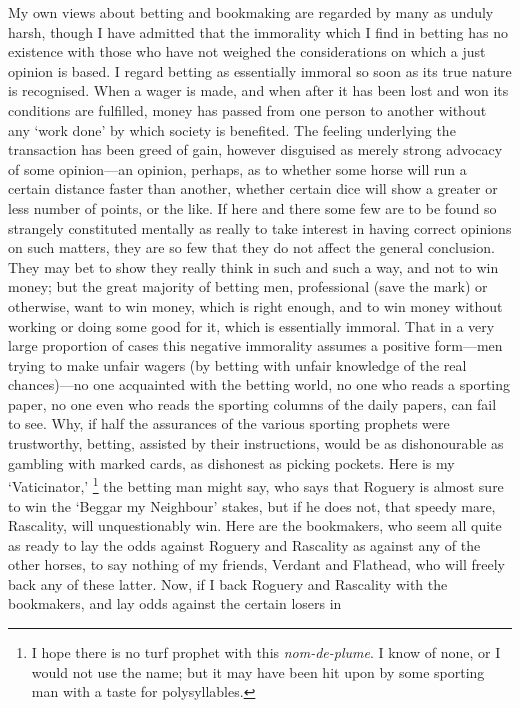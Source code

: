 \documentclass[letterpaper,12pt,oneside,openany]{memoir}
\begin{document}
My own views about betting and bookmaking are
regarded by many as unduly harsh, though I have
admitted that the immorality which I find in betting
has no existence with those who have not weighed
the considerations on which a just opinion is based.
I regard betting as essentially immoral so soon as its
true nature is recognised. When a wager is made,
and when after it has been lost and won its conditions
are fulfilled, money has passed from one person to
another without any `work done' by which society is
benefited. The feeling underlying the transaction has
been greed of gain, however disguised as merely strong
advocacy of some opinion---an opinion, perhaps, as to
whether some horse will run a certain distance faster
than another, whether certain dice will show a greater
or less number of points, or the like. If here and there
some few are to be found so strangely constituted
mentally as really to take interest in having correct
opinions on such matters, they are so few that they do
not affect the general conclusion. They may bet to
show they really think in such and such a way, and
not to win money; but the great majority of betting
men, professional (save the mark) or otherwise, want
to win money, which is right enough, and to win
money without working or doing some good for it,
which is essentially immoral. That in a very large
proportion of cases this negative immorality assumes
a positive form---men trying to make unfair wagers
(by betting with unfair knowledge of the real chances)---no
one acquainted with the betting world, no one
who reads a sporting paper, no one even who reads
the sporting columns of the daily papers, can fail to
see. Why, if half the assurances of the various sporting
prophets were trustworthy, betting, assisted by their
instructions, would be as dishonourable as gambling
with marked cards, as dishonest as picking pockets.
Here is my `Vaticinator,'%
\footnote{I hope there is no turf prophet with this \textit{nom-de-plume}. I
know of none, or I would not use the name; but it may have been
hit upon by some sporting man with a taste for polysyllables.}
the betting man might say,
who says that Roguery is almost sure to win the
`Beggar my Neighbour' stakes, but if he does not, that
speedy mare, Rascality, will unquestionably win. Here
are the bookmakers, who seem all quite as ready to lay
the odds against Roguery and Rascality as against any
of the other horses, to say nothing of my friends, Verdant
and Flathead, who will freely back any of these
latter. Now, if I back Roguery and Rascality with the
bookmakers, and lay odds against the certain losers in
\end{document}

